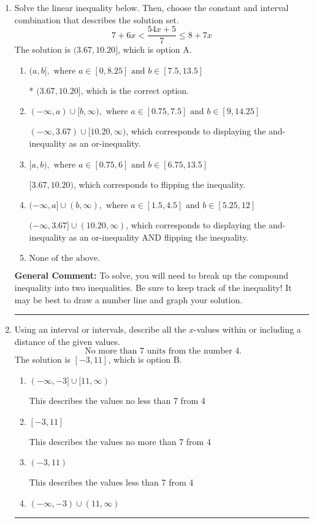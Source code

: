\documentclass{extbook}[14pt]
\newcommand{\litem}[1]{\item #1

\rule{\textwidth}{0.4pt}}
\begin{document}
\begin{enumerate}\litem{
Solve the linear inequality below. Then, choose the constant and interval combination that describes the solution set.
\[ 7 + 6 x < \frac{54 x + 5}{7} \leq 8 + 7 x \]The solution is \( (3.67, 10.20] \), which is option A.\begin{enumerate}[label=\Alph*.]
\item \( (a, b], \text{ where } a \in [0, 8.25] \text{ and } b \in [7.5, 13.5] \)

* $(3.67, 10.20]$, which is the correct option.
\item \( (-\infty, a) \cup [b, \infty), \text{ where } a \in [0.75, 7.5] \text{ and } b \in [9, 14.25] \)

$(-\infty, 3.67) \cup [10.20, \infty)$, which corresponds to displaying the and-inequality as an or-inequality.
\item \( [a, b), \text{ where } a \in [0.75, 6] \text{ and } b \in [6.75, 13.5] \)

$[3.67, 10.20)$, which corresponds to flipping the inequality.
\item \( (-\infty, a] \cup (b, \infty), \text{ where } a \in [1.5, 4.5] \text{ and } b \in [5.25, 12] \)

$(-\infty, 3.67] \cup (10.20, \infty)$, which corresponds to displaying the and-inequality as an or-inequality AND flipping the inequality.
\item \( \text{None of the above.} \)


\end{enumerate}

\textbf{General Comment:} To solve, you will need to break up the compound inequality into two inequalities. Be sure to keep track of the inequality! It may be best to draw a number line and graph your solution.
}
\litem{
Using an interval or intervals, describe all the $x$-values within or including a distance of the given values.
\[ \text{ No more than } 7 \text{ units from the number } 4. \]The solution is \( [-3, 11] \), which is option B.\begin{enumerate}[label=\Alph*.]
\item \( (-\infty, -3] \cup [11, \infty) \)

This describes the values no less than 7 from 4
\item \( [-3, 11] \)

This describes the values no more than 7 from 4
\item \( (-3, 11) \)

This describes the values less than 7 from 4
\item \( (-\infty, -3) \cup (11, \infty) \)


\end{enumerate}}
\end{enumerate}
\end{document}
